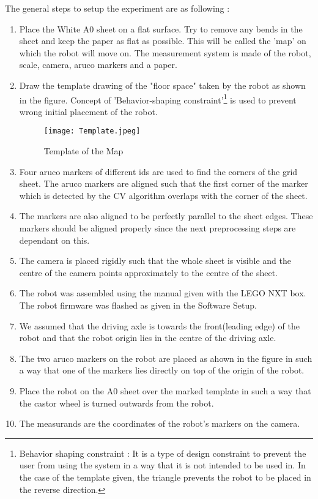 \documentclass[10pt,a4paper]{article}
\begin{document}
The general steps to setup the experiment are as following :
\begin{enumerate}
    \item
    Place the White A0 sheet on a flat surface.  Try to remove any bends in the sheet and keep the paper as flat as possible. This will be called the 'map' on which the robot will move on. The measurement system is made of the robot, scale, camera, aruco markers and a paper. 
    \item
    Draw the template drawing of the "floor space" taken by the robot as shown in the figure. Concept of 'Behavior-shaping constraint'\footnote{Behavior shaping constraint : It is a type of design constraint to prevent the user from using the system in a way that it is not intended to be used in. In the case of the template given, the triangle prevents the robot to be placed in the reverse direction.} is used to prevent wrong initial placement of the robot.
    
    
    \begin{figure}[H]
	\centering
    \texttt{[image: Template.jpeg]}
    \caption{ Template of the Map}
    \end{figure}

	\item
	Four aruco markers of different ids are used to find the corners of the grid sheet. The aruco markers are aligned such that the first corner of the marker which is detected by the CV algorithm overlaps with the corner of the sheet.
	\item
	The markers are also aligned to be perfectly parallel to the sheet edges. These markers should be aligned properly since the next preprocessing steps are dependant on this.
	\item
	The camera is placed rigidly such that the whole sheet is visible and the centre of the camera points approximately to the centre of the sheet.	
    \item
    The robot was assembled using the manual given with the LEGO NXT box. The robot firmware was flashed as given in the Software Setup. 
    \item
    We assumed that the driving axle is towards the front(leading edge) of the robot and that the robot origin lies in the centre of the driving axle.
    \item
    The two aruco markers on the robot are placed as ahown in the figure in such a way that one of the markers lies directly on top of the origin of the robot.
    \item
    Place the robot on the A0 sheet over the marked template in such a way that the castor wheel is turned outwards from the robot.
    \item
	The measurands are the coordinates of the robot's markers on the camera.
    
\end{enumerate}
\vspace{0.5cm}
\end{document}
